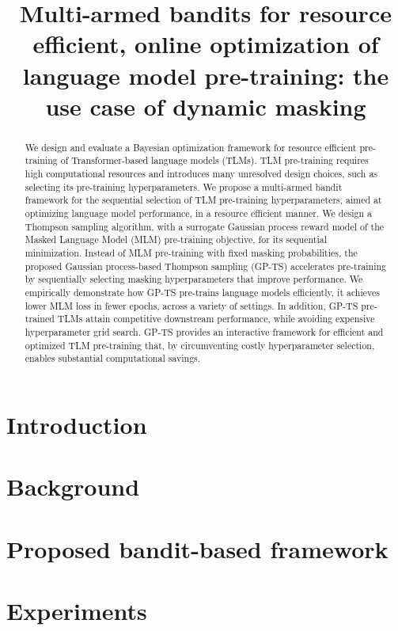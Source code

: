 \documentclass{article}
\title{Multi-armed bandits 
for resource efficient, online optimization of \\
language model pre-training: 
the use case of dynamic masking
\vspace*{1ex}
}
\begin{document}
\maketitle

\begin{abstract}
We design and evaluate a Bayesian optimization framework for resource efficient pre-training of Transformer-based language models (TLMs).
TLM pre-training requires high computational resources and introduces many unresolved design choices,
such as selecting its pre-training hyperparameters.
We propose a multi-armed bandit framework for the sequential selection of TLM pre-training hyperparameters,
aimed at optimizing language model performance, in a resource efficient manner.
We design a Thompson sampling algorithm,
with a surrogate Gaussian process reward model of the Masked Language Model (MLM) pre-training objective,
for its sequential minimization.
Instead of MLM pre-training with fixed masking probabilities,
the proposed Gaussian process-based Thompson sampling (GP-TS) accelerates pre-training
by sequentially selecting masking hyperparameters that improve performance.
We empirically demonstrate how GP-TS pre-trains language models efficiently,
\ie it achieves lower MLM loss in fewer epochs, across a variety of settings.
In addition, GP-TS pre-trained TLMs attain competitive downstream performance,
while avoiding expensive hyperparameter grid search.
GP-TS provides an interactive framework for efficient and optimized TLM pre-training that,
by circumventing costly hyperparameter selection,
enables substantial computational savings.
\end{abstract}

\section{Introduction}
\label{sec:submission}


\section{Background}
\label{sec:background}


\section{Proposed bandit-based framework}
\label{sec:method}


\section{Experiments}
\label{sec:experiments}

\end{document}
